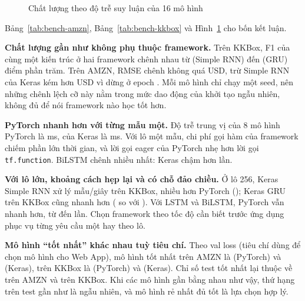 \begin{figure}[H]
  \centering
  \caption{Chất lượng theo độ trễ suy luận của 16 mô hình}
  \label{fig:scatter}
\end{figure}

Bảng~\ref{tab:bench-amzn}, Bảng~\ref{tab:bench-kkbox} và Hình~\ref{fig:scatter} cho bốn kết luận.

\textbf{Chất lượng gần như không phụ thuộc framework.} Trên KKBox, F1 của cùng một kiến trúc ở hai framework chênh nhau
từ  (Simple RNN) đến  (GRU) điểm phần trăm. Trên AMZN, RMSE chênh không
quá  USD, trừ Simple RNN của Keras kém hơn  USD vì dừng ở
epoch . Mỗi mô hình chỉ chạy một seed, nên những chênh lệch cỡ này nằm trong mức
dao động của khởi tạo ngẫu nhiên, không đủ để nói framework nào học tốt hơn.

\textbf{PyTorch nhanh hơn với từng mẫu một.} Độ trễ trung vị của 8 mô hình PyTorch là  ms,
của Keras là  ms. Với lô một mẫu, chi phí gọi hàm của framework chiếm phần lớn thời gian, và
lời gọi eager của PyTorch nhẹ hơn lời gọi \texttt{tf.function}. BiLSTM chênh nhiều nhất: Keras chậm hơn
 lần.

\textbf{Với lô lớn, khoảng cách hẹp lại và có chỗ đảo chiều.} Ở lô 256, Keras Simple RNN xử lý
 mẫu/giây trên KKBox, nhiều hơn PyTorch
(); Keras GRU trên KKBox cũng nhanh hơn
( so với ). Với LSTM và BiLSTM,
PyTorch vẫn nhanh hơn, từ  đến  lần. Chọn framework theo tốc độ cần biết trước ứng dụng phục vụ từng
yêu cầu một hay theo lô.

\textbf{Mô hình ``tốt nhất'' khác nhau tuỳ tiêu chí.} Theo val loss (tiêu chí dùng để chọn mô hình cho Web App), mô hình
tốt nhất trên AMZN là  (PyTorch) và  (Keras), trên
KKBox là  (PyTorch) và  (Keras). Chỉ số test tốt nhất
lại thuộc về  trên AMZN và  trên KKBox. Khi các mô hình gần bằng nhau như vậy, thứ hạng trên test gần
như là ngẫu nhiên, và mô hình rẻ nhất đủ tốt là lựa chọn hợp lý.

